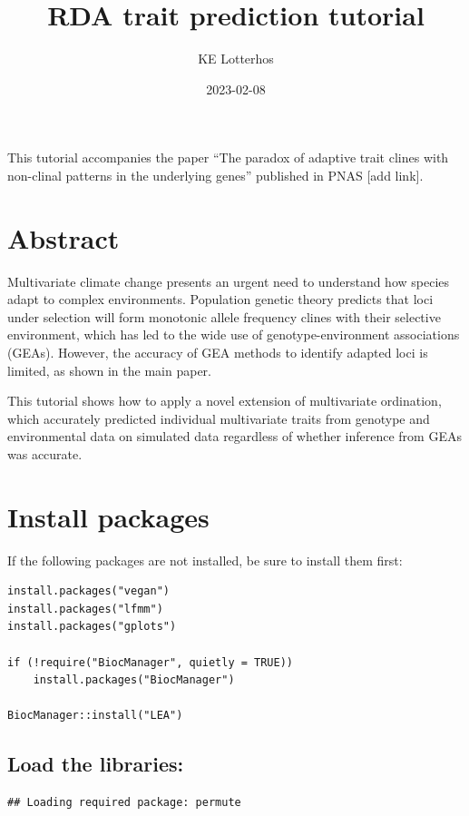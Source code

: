 \documentclass[
]{article}
\title{RDA trait prediction tutorial}
\author{KE Lotterhos}
\date{2023-02-08}
\begin{document}
\maketitle

This tutorial accompanies the paper ``The paradox of adaptive trait
clines with non-clinal patterns in the underlying genes'' published in
PNAS {[}add link{]}.

\hypertarget{abstract}{%
\section{Abstract}\label{abstract}}

Multivariate climate change presents an urgent need to understand how
species adapt to complex environments. Population genetic theory
predicts that loci under selection will form monotonic allele frequency
clines with their selective environment, which has led to the wide use
of genotype-environment associations (GEAs). However, the accuracy of
GEA methods to identify adapted loci is limited, as shown in the main
paper.

This tutorial shows how to apply a novel extension of multivariate
ordination, which accurately predicted individual multivariate traits
from genotype and environmental data on simulated data regardless of
whether inference from GEAs was accurate.

\hypertarget{install-packages}{%
\section{Install packages}\label{install-packages}}

If the following packages are not installed, be sure to install them
first:

\begin{verbatim}
install.packages("vegan")
install.packages("lfmm")
install.packages("gplots")

if (!require("BiocManager", quietly = TRUE))
    install.packages("BiocManager")

BiocManager::install("LEA")
\end{verbatim}

\hypertarget{load-the-libraries}{%
\subsection{Load the libraries:}\label{load-the-libraries}}

\begin{verbatim}
## Loading required package: permute
\end{verbatim}
\end{document}
